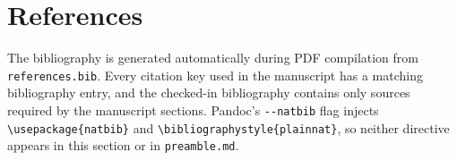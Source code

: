 \documentclass[
]{article}
\begin{document}
\newpage

\section{References}\label{references}

The bibliography is generated automatically during PDF compilation from
\texttt{references.bib}. Every citation key used in the manuscript has a
matching bibliography entry, and the checked-in bibliography contains
only sources required by the manuscript sections. Pandoc's
\texttt{-\/-natbib} flag injects
\texttt{\textbackslash{}usepackage\{natbib\}} and
\texttt{\textbackslash{}bibliographystyle\{plainnat\}}, so neither
directive appears in this section or in \texttt{preamble.md}.

\providecommand{\bibsection}{}
\renewcommand{\bibsection}{}


\end{document}
